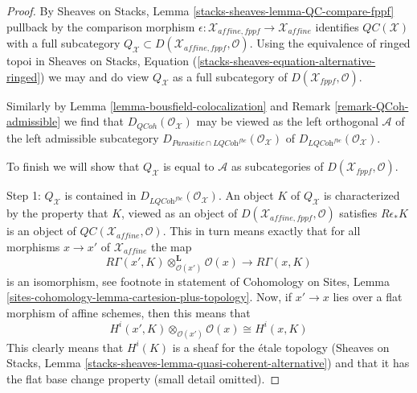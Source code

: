 \documentclass[10pt,a4paper]{amsart}
\theoremstyle{plain}
\theoremstyle{definition}
\theoremstyle{remark}
\numberwithin{equation}{subsection}
\def\QCoh{\mathit{QCoh}}
\begin{document}
\begin{proof}
By Sheaves on Stacks, Lemma \ref{stacks-sheaves-lemma-QC-compare-fppf}
pullback by the comparison morphism
$\epsilon : \mathcal{X}_{affine, fppf} \to \mathcal{X}_{affine}$
identifies $\mathit{QC}(\mathcal{X})$ with a full subcategory
$Q_\mathcal{X} \subset D(\mathcal{X}_{affine, fppf}, \mathcal{O})$.
Using the equivalence of ringed topoi in
Sheaves on Stacks, Equation (\ref{stacks-sheaves-equation-alternative-ringed})
we may and do view $Q_\mathcal{X}$ as a full subcategory of
$D(\mathcal{X}_{fppf}, \mathcal{O})$.

\medskip\noindent
Similarly by Lemma \ref{lemma-bousfield-colocalization} and
Remark \ref{remark-QCoh-admissible} we find that
$D_\QCoh(\mathcal{O}_\mathcal{X})$ may be viewed as the
left orthogonal $\mathcal{A}$ of the left admissible subcategory
$D_{\textit{Parasitic} \cap \textit{LQCoh}^{fbc}}(\mathcal{O}_\mathcal{X})$
of $D_{\textit{LQCoh}^{fbc}}(\mathcal{O}_\mathcal{X})$.

\medskip\noindent
To finish we will show that $Q_\mathcal{X}$ is equal to
$\mathcal{A}$ as subcategories of $D(\mathcal{X}_{fppf}, \mathcal{O})$.

\medskip\noindent
Step 1: $Q_\mathcal{X}$ is contained in
$D_{\textit{LQCoh}^{fbc}}(\mathcal{O}_\mathcal{X})$.
An object $K$ of $Q_\mathcal{X}$ is characterized by the property
that $K$, viewed as an object of $D(\mathcal{X}_{affine, fppf}, \mathcal{O})$
satisfies $R\epsilon_*K$ is an object of
$\mathit{QC}(\mathcal{X}_{affine}, \mathcal{O})$.
This in turn means exactly that for all morphisms $x \to x'$
of $\mathcal{X}_{affine}$ the map
$$
R\Gamma(x', K) \otimes_{\mathcal{O}(x')}^\mathbf{L} \mathcal{O}(x)
\longrightarrow
R\Gamma(x, K)
$$
is an isomorphism, see footnote in statement of Cohomology on Sites,
Lemma \ref{sites-cohomology-lemma-cartesion-plus-topology}.
Now, if $x' \to x$ lies over a flat morphism of affine schemes,
then this means that
$$
H^i(x', K) \otimes_{\mathcal{O}(x')} \mathcal{O}(x)
\cong
H^i(x, K)
$$
This clearly means that $H^i(K)$ is a sheaf for the \'etale topology
(Sheaves on Stacks, Lemma \ref{stacks-sheaves-lemma-quasi-coherent-alternative})
and that it has the flat base change property (small detail omitted).


\end{proof}
\end{document}

